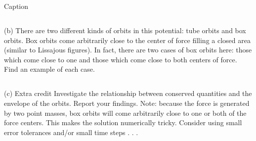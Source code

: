 \begin{table}[]
    \centering

    \caption{Caption}
    \label{tab:my_label}
\end{table}

\subsection{}
(b) There are two different kinds of orbits in this potential: tube orbits
and box orbits. Box orbits come arbitrarily close to the center of
force filling a closed area (similar to Lissajous figures). In fact,
there are two cases of box orbits here: those which come close to
one and those which come close to both centers of force. Find an
example of each case.
\subsection{}
(c) Extra credit Investigate the relationship between conserved quantities and the envelope of the orbits. Report your findings.
Note: because the force is generated by two point masses, box orbits
will come arbitrarily close to one or both of the force centers. This
makes the solution numerically tricky. Consider using small error tolerances and/or small time steps . . .